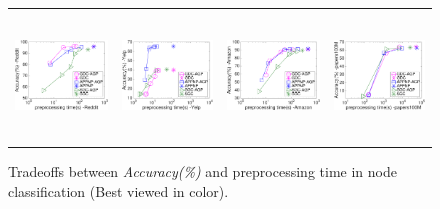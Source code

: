 \begin{figure}[t]
	\begin{small}
		\centering
		\begin{tabular}{cccc}
			\hspace{-4mm} \includegraphics[height=34mm]{./Figs/GNN-accuracy-query-Reddit.eps} &
			\hspace{-4mm} \includegraphics[height=34mm]{./Figs/GNN-accuracy-query-Yelp.eps} &
			\hspace{-2mm} \includegraphics[height=34mm]{./Figs/GNN-accuracy-query-Amazon.eps} &
			\hspace{-4mm} \includegraphics[height=34mm]{./Figs/GNN-accuracy-query-papers100M.eps} 
		\end{tabular}
		\vspace{-5mm}
		\caption{Tradeoffs between {\em Accuracy(\%)} and preprocessing time in node classification (Best viewed in color).}
		\label{fig:GNN-accuracy-query}
		\vspace{-2mm}
	\end{small}
\end{figure}

